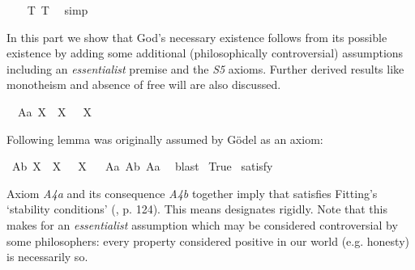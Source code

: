 \begin{isabellebody}
\ \ %
%
\isamarkupfalse%
\ T{}\ T{}\ \isamarkupfalse%
\ simp%
%
%
%
\isamarkuptrue%
%
\begin{isamarkuptext}%
In this part we show that God's necessary existence follows from its possible existence by adding some
 additional (philosophically controversial) assumptions including an \emph{essentialist} premise 
 and the \emph{S5} axioms. Further derived results like monotheism and absence of free will are also discussed.%
\end{isamarkuptext}\isamarkuptrue%
\isamarkupfalse%
\ \ A{}a{\isacharcolon}\ {\isachardoublequoteopen}{\isasymlfloor}\isactrlbold {\isasymforall}X{\isachardot}\ {\isasymP}\ X\ \isactrlbold {\isasymrightarrow}\ \isactrlbold {\isasymbox}{\isacharparenleft}{\isasymP}\ X{\isacharparenright}{\isasymrfloor}{\isachardoublequoteclose}%
\begin{isamarkuptext}%
Following lemma was originally assumed by G\"odel as an axiom:%
\end{isamarkuptext}\isamarkuptrue%
\isamarkupfalse%
\ A{}b{\isacharcolon}\ {\isachardoublequoteopen}{\isasymlfloor}\isactrlbold {\isasymforall}X{\isachardot}\ \isactrlbold {\isasymnot}{\isacharparenleft}{\isasymP}\ X{\isacharparenright}\ \isactrlbold {\isasymrightarrow}\ \isactrlbold {\isasymbox}\isactrlbold {\isasymnot}{\isacharparenleft}{\isasymP}\ X{\isacharparenright}{\isasymrfloor}{\isachardoublequoteclose}%
\ %
%
\isamarkupfalse%
\ A{}a\ A{}b\ A{}a\ \isamarkupfalse%
\ blast%
%
%
\isanewline
{}\isamarkupfalse%
\ True\ \isamarkupfalse%
{\isacharbrackleft}satisfy{\isacharbrackright}%
\ %
%
\isamarkupfalse%
\ %
%
%
%
%
\begin{isamarkuptext}%
Axiom \emph{A4a} and its consequence \emph{A4b} together imply that \isa{{\isasymP}} satisfies Fitting's
`stability conditions' (\cite{Fitting}, p. 124). This means \isa{{\isasymP}} designates rigidly.
Note that this makes for an \emph{essentialist} assumption which may be considered controversial by
some philosophers: every property considered positive in our world (e.g. honesty) is necessarily so.%
\end{isamarkuptext}\isamarkuptrue%
\isamarkupfalse%

\end{isabellebody}
